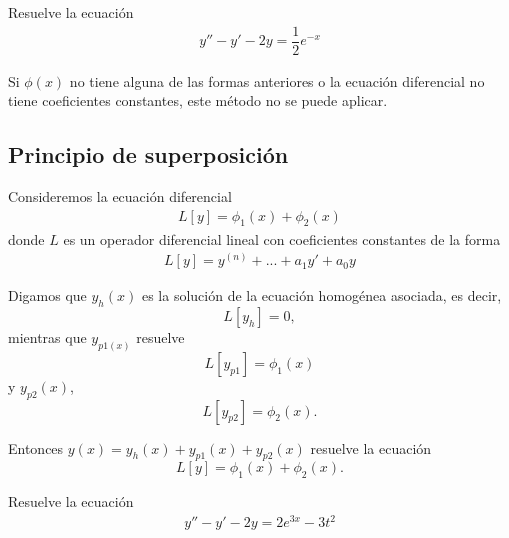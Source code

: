 {}
\begin{problema}
	Resuelve la ecuación
	\begin{align*}
		y''-y'-2y = \dfrac{1}{2}e^{-x}
	\end{align*}
	
\end{problema}



\begin{rem}
	Si  $\phi(x)$ no tiene alguna de las formas anteriores o la ecuaci\'on diferencial no tiene coeficientes constantes, este m\'etodo no se puede aplicar.
\end{rem}


\subsection{Principio de superposición}

{}
Consideremos la ecuación diferencial 
\begin{align}
	\label{superposicion}
	L[y] = \phi_{1}(x) + \phi_{2}(x)
\end{align}
donde $L$ es un operador diferencial lineal con coeficientes constantes de la forma 
\begin{align*}
	L[y] = y^{(n)}+...+a_{1}y'+a_{0}y
\end{align*}



{}
Digamos que $y_{h}(x)$ es la solución de la ecuación homogénea asociada, es decir, $$L[y_{h}]=0,$$ mientras que $y_{p1(x)}$ resuelve $$L[y_{p1}]=\phi_{1}(x)$$ y $y_{p2}(x)$, $$L[y_{p2}]=\phi_{2}(x).$$

{}
Entonces $y(x)=y_{h}(x)+y_{p1}(x)+y_{p2}(x)$ resuelve la ecuación 
$$
L[y]=\phi_{1}(x)+\phi_{2}(x).
$$

{}
\begin{problema}
	Resuelve la ecuación
	\begin{align*}
		y''-y'-2y=2e^{3x}-3t^{2}
	\end{align*}
	
\end{problema}


